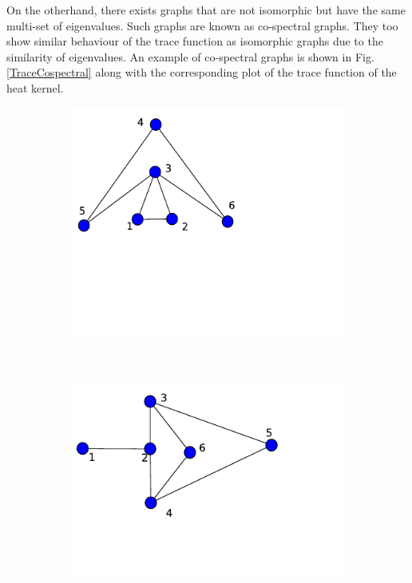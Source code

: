 \documentclass[10pt,a4paper]{article}
\begin{document}
        On the otherhand, there exists graphs that are not isomorphic but have the same multi-set of eigenvalues. Such graphs are known as co-spectral graphs. They too show similar behaviour of the trace function as isomorphic graphs due to the similarity of eigenvalues. An example of co-spectral graphs is shown in Fig.\ref{TraceCospectral} along with the corresponding plot of the trace function of the heat kernel.
        \begin{figure}[H]
        	\centering
        	\begin{subfigure}[b]{0.30\textwidth}
        		\includegraphics[width= \textwidth]{images/graph-cospectral1.pdf}
        		\caption{}
        		\label{cospectralgraph1}
        	\end{subfigure}~
        	\begin{subfigure}[b]{0.30\textwidth}
        		\includegraphics[width= \textwidth]{images/graph-cospectral2.pdf}

\end{subfigure}
\end{figure}
\end{document}
